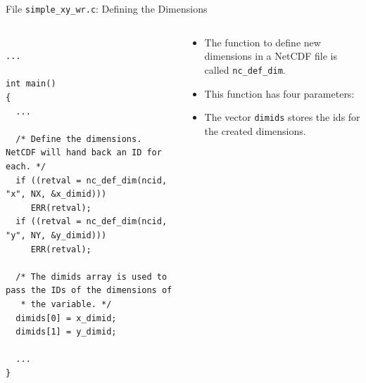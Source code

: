 \documentclass[compress,11pt,xcolor=svgnames,aspectratio=169]{beamer}
\begin{document}
\begin{frame}[fragile]{File \texttt{simple\_xy\_wr.c}: Defining the Dimensions}

\begin{columns}

\begin{column}{0.5\textwidth}

{\tiny

\begin{verbatim}

...

int main()
{
  ...

  /* Define the dimensions. NetCDF will hand back an ID for each. */
  if ((retval = nc_def_dim(ncid, "x", NX, &x_dimid)))
     ERR(retval);
  if ((retval = nc_def_dim(ncid, "y", NY, &y_dimid)))
     ERR(retval);

  /* The dimids array is used to pass the IDs of the dimensions of
   * the variable. */
  dimids[0] = x_dimid;
  dimids[1] = y_dimid;

  ...
}

\end{verbatim}

}

\end{column}

\begin{column}{0.5\textwidth}

{\footnotesize

\begin{itemize}
\setlength\itemsep{0.5cm}

\item The function to define new dimensions in a NetCDF file is called \verb|nc_def_dim|.

\item This function has four parameters:


\item The vector \verb|dimids| stores the ids for the created dimensions.

\end{itemize}

}

\end{column}

\end{columns}

\end{frame}
\end{document}

